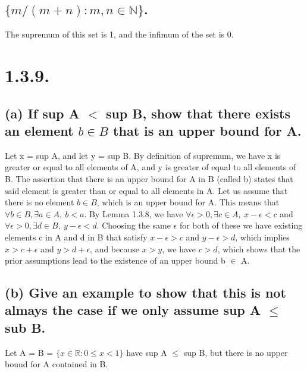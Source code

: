 \documentclass[12pt,letterpaper]{article}
\begin{document}
\subsection{\(\{m/(m+n) : m,n \in \mathbb{N}\}\).}

	The supremum of this set is 1, and the infimum of the set is 0.
	
\section{1.3.9.}

\subsection{(a) If sup A \(<\) sup B, show that there exists an element \(b \in B\) that is an upper bound for A.}

	Let x = sup A, and let y = sup B. By definition of supremum, we have x is greater or equal to all elements of A, and y is greater of equal to all elements of B. The assertion that there is an upper bound for A in B (called b) states that said element is greater than or equal to all elements in A. Let us assume that there is no element \(b \in B\), which is an upper bound for A. This means that \(\forall b \in B, \exists a \in A,\ b < a\). By Lemma 1.3.8, we have \(\forall \epsilon > 0, \exists c \in A,\ x - \epsilon < c\) and \(\forall \epsilon > 0, \exists d \in B,\ y - \epsilon < d\). Choosing the same \(\epsilon\) for both of these we have existing elements c in A and d in B that satisfy \(x - \epsilon > c\) and \(y - \epsilon > d\), which implies \(x > c + \epsilon\) and \(y > d + \epsilon\), and because \(x > y\), we have \(c > d\), which shows that the prior assumptions lead to the existence of an upper bound b \(\in\) A.
	
\subsection{(b) Give an example to show that this is not almays the case if we only assume sup A \(\leq\) sub B.}

	Let A = B = \(\{x \in \mathbb{R} : 0 \leq x < 1\}\) have sup A \(\leq\) sup B, but there is no upper bound for A contained in B.
\end{document}

